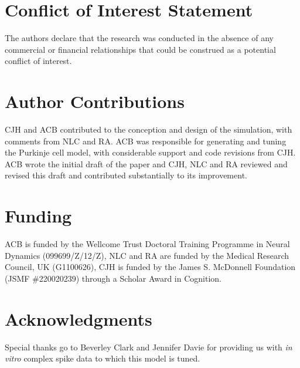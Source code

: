 \documentclass[utf8]{frontiersSCNS} %
\begin{document}
\section*{Conflict of Interest Statement}

The authors declare that the research was conducted in the absence of any commercial or financial relationships that could be construed as a potential conflict of interest.

\section*{Author Contributions}
CJH and ACB contributed to the conception and design of the simulation, with comments from NLC and RA. ACB was responsible for generating and tuning the Purkinje cell model, with considerable support and code revisions from CJH. ACB wrote the initial draft of the paper and CJH, NLC and RA reviewed and revised this draft and contributed substantially to its improvement.  

\section*{Funding}
ACB is funded by the Wellcome Trust Doctoral Training Programme
in Neural Dynamics (099699/Z/12/Z), NLC and RA are funded by the
Medical Research Council, UK (G1100626), CJH is funded by the James
S. McDonnell Foundation (JSMF \#220020239) through a Scholar Award in
Cognition.

\section*{Acknowledgments}
Special thanks go to Beverley Clark and Jennifer Davie for providing
us with \textit{in vitro} complex spike data to which this model is
tuned.
\end{document}
